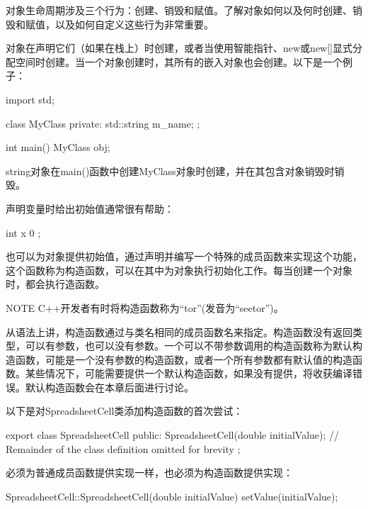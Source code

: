 
对象生命周期涉及三个行为：创建、销毁和赋值。了解对象如何以及何时创建、销毁和赋值，以及如何自定义这些行为非常重要。


对象在声明它们（如果在栈上）时创建，或者当使用智能指针、new或new[]显式分配空间时创建。当一个对象创建时，其所有的嵌入对象也会创建。以下是一个例子：

\begin{cpp}
import std;

class MyClass
{
    private:
    std::string m_name;
};

int main()
{
    MyClass obj;
}
\end{cpp}

string对象在main()函数中创建MyClass对象时创建，并在其包含对象销毁时销毁。

声明变量时给出初始值通常很有帮助：

\begin{cpp}
int x { 0 };
\end{cpp}

也可以为对象提供初始值，通过声明并编写一个特殊的成员函数来实现这个功能，这个函数称为构造函数，可以在其中为对象执行初始化工作。每当创建一个对象时，都会执行造函数。

\begin{myNotic}{NOTE}
C++开发者有时将构造函数称为“tor”(发音为“seetor”)。
\end{myNotic}


从语法上讲，构造函数通过与类名相同的成员函数名来指定。构造函数没有返回类型，可以有参数，也可以没有参数。一个可以不带参数调用的构造函数称为默认构造函数，可能是一个没有参数的构造函数，或者一个所有参数都有默认值的构造函数。某些情况下，可能需要提供一个默认构造函数，如果没有提供，将收获编译错误。默认构造函数会在本章后面进行讨论。

以下是对SpreadsheetCell类添加构造函数的首次尝试：

\begin{cpp}
export class SpreadsheetCell
{
    public:
        SpreadsheetCell(double initialValue);
        // Remainder of the class definition omitted for brevity
};
\end{cpp}

必须为普通成员函数提供实现一样，也必须为构造函数提供实现：

\begin{cpp}
SpreadsheetCell::SpreadsheetCell(double initialValue)
{
    setValue(initialValue);
}
\end{cpp}

